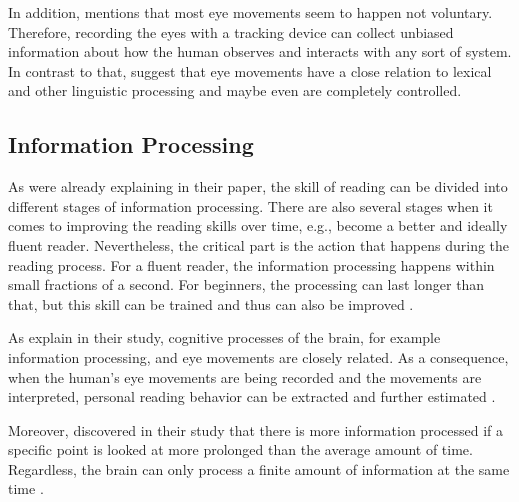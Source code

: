 In addition, \textcite{bruneau2002eyes} mentions that most eye movements seem to happen not voluntary. Therefore, recording the eyes with a tracking device can collect unbiased information about how the human observes and interacts with any sort of system. In contrast to that, \textcite{clifton2016eye} suggest that eye movements have a close relation to lexical and other linguistic processing and maybe even are completely controlled.

\subsection{Information Processing}
\label{subsection:InformationProcessing}

As \textcite{laberge1974toward} were already explaining in their paper, the skill of reading can be divided into different stages of information processing. There are also several stages when it comes to improving the reading skills over time, e.g., become a better and ideally fluent reader. Nevertheless, the critical part is the action that happens during the reading process. For a fluent reader, the information processing happens within small fractions of a second. For beginners, the processing can last longer than that, but this skill can be trained and thus can also be improved \autocite{laberge1974toward}.

As \textcite{biedert2010eyebook} explain in their study, cognitive processes of the brain, for example information processing, and eye movements are closely related.  As a consequence, when the human's eye movements are being recorded and the movements are interpreted, personal reading behavior can be extracted and further estimated \autocite{biedert2010eyebook}.

Moreover, \textcite{buscher2009you} discovered in their study that there is more information processed if a specific point is looked at more prolonged than the average amount of time. Regardless, the brain can only process a finite amount of information at the same time \autocite{biedert2010eyebook}.

